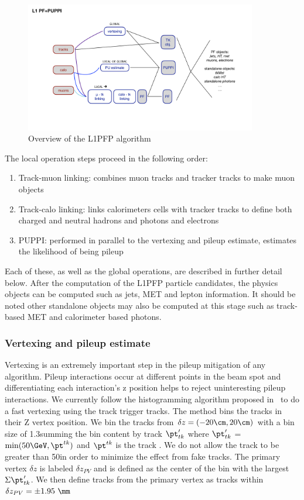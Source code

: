\begin{figure}[htb]
\centering
\includegraphics[width=0.9\textwidth] {figures/l1pfp.pdf}
\caption{
Overview of the L1PFP algorithm
\label{fig:l1pfp}
}
\end{figure}

The local operation steps proceed in the following order: 
\begin{enumerate}
\item Track-muon linking: combines muon tracks and tracker tracks to make muon objects
\item Track-calo linking: links calorimeters cells with tracker tracks to define both charged and neutral hadrons and photons and electrons
\item PUPPI: performed in parallel to the vertexing and pileup estimate, estimates the likelihood of being pileup
\end{enumerate}

Each of these, as well as the global operations, are described in further detail below.  
After the computation of the L1PFP particle candidates, the physics objects can be computed such as jets, MET and lepton information.  
It should be noted other standalone objects may also be computed at this stage such as track-based MET and calorimeter based photons.

\subsubsection{Vertexing and pileup estimate}

Vertexing is an extremely important step in the pileup mitigation of any algorithm. 
Pileup interactions occur at different points in the beam spot and differentiating each interaction's z position helps to reject uninteresting pileup interactions. 
We currently follow the histogramming algorithm proposed in~\cite{Contardo:2020886} to do a fast vertexing using the track trigger tracks.
The method bins the tracks in their Z vertex position.  
We bin the tracks from $\delta z = ( -20\cm,20\cm )$ with a bin size of 1.3\mm summing the bin content by track $\pt_{tk}'$ where $\pt_{tk}'$ = $\text{min}(50\GeV, \pt^{tk})$ 
and $\pt^{tk}$ is the track \pt.
We do not allow the track \pt to be greater than 50\GeV in order to minimize the effect from fake tracks.
The primary vertex $\delta z$ is labeled $\delta z_{PV}$ and is defined as the center of the bin with the largest $\Sigma \pt_{tk}'$.
We then define tracks from the primary vertex as tracks within $\delta z_{PV} = \pm 1.95~\mm$

